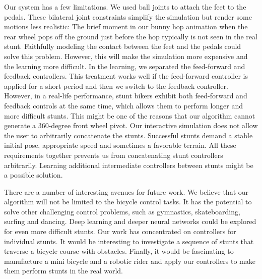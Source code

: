 Our system has a few limitations. We used ball joints to attach the feet to the pedals. These bilateral joint constraints simplify the simulation but render some motions less realistic: The brief moment in our bunny hop animation when the rear wheel pops off the ground just before the hop typically is not seen in the real stunt. Faithfully modeling the contact between the feet and the pedals could solve this problem. However, this will make the simulation more expensive and the learning more difficult. In the learning, we separated the feed-forward and feedback controllers. This treatment works well if the feed-forward controller is applied for a short period and then we switch to the feedback controller. However, in a real-life performance, stunt bikers exhibit both feed-forward and feedback controls at the same time, which allows them to perform longer and more difficult stunts. This might be one of the reasons that our algorithm cannot generate a 360-degree front wheel pivot. Our interactive simulation does not allow the user to arbitrarily concatenate the stunts. Successful stunts demand a stable initial pose, appropriate speed and sometimes a favorable terrain. All these requirements together prevents us from concatenating stunt controllers arbitrarily. Learning additional intermediate controllers between stunts might be a possible solution.

There are a number of interesting avenues for future work.  We believe that our algorithm will not be limited to the bicycle control tasks. It has the potential to solve other challenging control problems, such as gymnastics, skateboarding, surfing and dancing. Deep learning \cite{Hinton:2007} and deeper neural networks could be explored for even more difficult stunts. Our work has concentrated on controllers for individual stunts. It would be interesting to investigate a sequence of stunts that traverse a bicycle course with obstacles. Finally, it would be fascinating to manufacture a mini bicycle and a robotic rider and apply our controllers to make them perform stunts in the real world.
